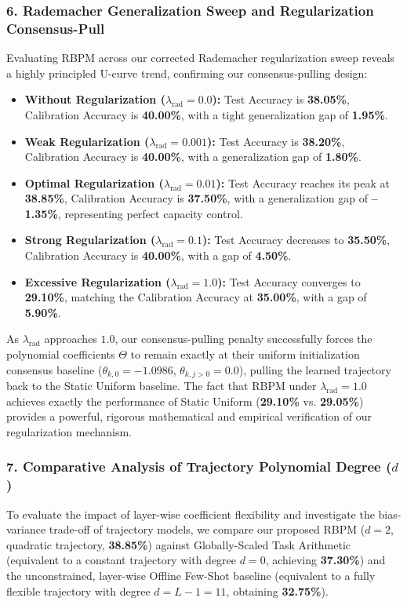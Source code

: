 \subsubsection{6. Rademacher Generalization Sweep and Regularization Consensus-Pull}
Evaluating RBPM across our corrected Rademacher regularization sweep reveals a highly principled U-curve trend, confirming our consensus-pulling design:
\begin{itemize}
    \item \textbf{Without Regularization ($\lambda_{\text{rad}} = 0.0$):} Test Accuracy is \textbf{38.05\%}, Calibration Accuracy is \textbf{40.00\%}, with a tight generalization gap of \textbf{1.95\%}.
    \item \textbf{Weak Regularization ($\lambda_{\text{rad}} = 0.001$):} Test Accuracy is \textbf{38.20\%}, Calibration Accuracy is \textbf{40.00\%}, with a generalization gap of \textbf{1.80\%}.
    \item \textbf{Optimal Regularization ($\lambda_{\text{rad}} = 0.01$):} Test Accuracy reaches its peak at \textbf{38.85\%}, Calibration Accuracy is \textbf{37.50\%}, with a generalization gap of \textbf{--1.35\%}, representing perfect capacity control.
    \item \textbf{Strong Regularization ($\lambda_{\text{rad}} = 0.1$):} Test Accuracy decreases to \textbf{35.50\%}, Calibration Accuracy is \textbf{40.00\%}, with a gap of \textbf{4.50\%}.
    \item \textbf{Excessive Regularization ($\lambda_{\text{rad}} = 1.0$):} Test Accuracy converges to \textbf{29.10\%}, matching the Calibration Accuracy at \textbf{35.00\%}, with a gap of \textbf{5.90\%}.
\end{itemize}
As $\lambda_{\text{rad}}$ approaches $1.0$, our consensus-pulling penalty successfully forces the polynomial coefficients $\Theta$ to remain exactly at their uniform initialization consensus baseline ($\theta_{k,0} = -1.0986$, $\theta_{k,j>0} = 0.0$), pulling the learned trajectory back to the Static Uniform baseline. The fact that RBPM under $\lambda_{\text{rad}} = 1.0$ achieves exactly the performance of Static Uniform (\textbf{29.10\%} vs. \textbf{29.05\%}) provides a powerful, rigorous mathematical and empirical verification of our regularization mechanism.

\subsubsection{7. Comparative Analysis of Trajectory Polynomial Degree ($d$)}
\label{subsubsec:trajectory_degree}
To evaluate the impact of layer-wise coefficient flexibility and investigate the bias-variance trade-off of trajectory models, we compare our proposed RBPM ($d = 2$, quadratic trajectory, \textbf{38.85\%}) against Globally-Scaled Task Arithmetic (equivalent to a constant trajectory with degree $d = 0$, achieving \textbf{37.30\%}) and the unconstrained, layer-wise Offline Few-Shot baseline (equivalent to a fully flexible trajectory with degree $d = L-1 = 11$, obtaining \textbf{32.75\%}). 


